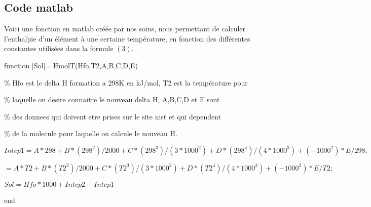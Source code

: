 \documentclass[11pt,a4paper]{report}
\begin{document}
\subsection*{Code matlab}
Voici une fonction en matlab créée par nos soins, nous permettant de calculer l'enthalpie d'un élément à une certaine
température, en fonction des différentes constantes utilisées dans la formule $(3)$.

function [Sol]= HmolT(Hfo,T2,A,B,C,D,E)

\% Hfo est le delta H formation a 298K en kJ/mol, T2 est la température pour

\% laquelle on desire connaitre le nouveau delta H, A,B,C,D et E sont

\% des donnees qui doivent etre prises sur le site nist et qui dependent

\% de la molecule pour laquelle on calcule le nouveau H.

$Intcp1 = A*298 + B* (298^2)/2000 + C*(298^3)/(3*1000^2) + D*(298^4)/(4*1000^3) + (-1000^2)*E/298;$

$ = A*T2 + B* (T2^2)/2000 + C*(T2^3)/(3*1000^2) + D*(T2^4)/(4*1000^3) + (-1000^2)*E/T2;$

$Sol = Hfo*1000 + Intcp2 - Intcp1$

end
\end{document}
